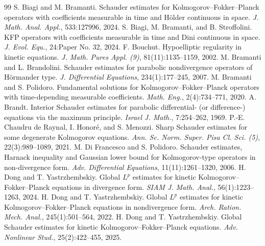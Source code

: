 \documentclass[10pt,a4paper]{amsart}
\numberwithin{equation}{section}
\begin{document}
\begin{thebibliography}{99}
 S. Biagi and M. Bramanti. \newblock Schauder estimates for Kolmogorov--Fokker--Planck operators with coefficients measurable in time and H\"older continuous in space. \newblock \emph{J. Math. Anal. Appl.}, 533:127996, 2024.
 S. Biagi, M. Bramanti, and B. Stroffolini. \newblock KFP operators with coefficients measurable in time and Dini continuous in space. \newblock \emph{J. Evol. Equ.}, 24:Paper No. 32, 2024.
 F. Bouchut. \newblock Hypoelliptic regularity in kinetic equations. \newblock \emph{J. Math. Pures Appl. (9)}, 81(11):1135--1159, 2002.
 M. Bramanti and L. Brandolini. \newblock Schauder estimates for parabolic nondivergence operators of H\"ormander type. \newblock \emph{J. Differential Equations}, 234(1):177--245, 2007.
 M. Bramanti and S. Polidoro. \newblock Fundamental solutions for Kolmogorov--Fokker--Planck operators with time-depending measurable coefficients. \newblock \emph{Math. Eng.}, 2(4):734--771, 2020.
 A. Brandt. \newblock Interior Schauder estimates for parabolic differential- (or difference-) equations via the maximum principle. \newblock \emph{Israel J. Math.}, 7:254--262, 1969.
 P.-E. Chaudru de Raynal, I. Honor\'e, and S. Menozzi. \newblock Sharp Schauder estimates for some degenerate Kolmogorov equations. \newblock \emph{Ann. Sc. Norm. Super. Pisa Cl. Sci. (5)}, 22(3):989--1089, 2021.
 M. Di Francesco and S. Polidoro. \newblock Schauder estimates, Harnack inequality and Gaussian lower bound for Kolmogorov-type operators in non-divergence form. \newblock \emph{Adv. Differential Equations}, 11(11):1261--1320, 2006.
 H. Dong and T. Yastrzhembskiy. \newblock Global \(L^p\) estimates for kinetic Kolmogorov--Fokker--Planck equations in divergence form. \newblock \emph{SIAM J. Math. Anal.}, 56(1):1223--1263, 2024.
 H. Dong and T. Yastrzhembskiy. \newblock Global \(L^p\) estimates for kinetic Kolmogorov--Fokker--Planck equations in nondivergence form. \newblock \emph{Arch. Ration. Mech. Anal.}, 245(1):501--564, 2022.
 H. Dong and T. Yastrzhembskiy. \newblock Global Schauder estimates for kinetic Kolmogorov--Fokker--Planck equations. \newblock \emph{Adv. Nonlinear Stud.}, 25(2):422--455, 2025.

\end{thebibliography}
\end{document}
